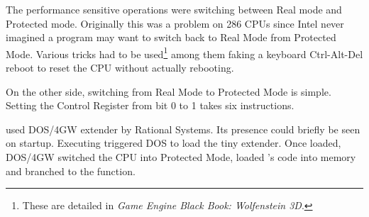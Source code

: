 The performance sensitive operations were switching between Real mode and Protected mode. Originally this was a problem on 286 CPUs since Intel never imagined a program may want to switch back to Real Mode from Protected Mode. Various tricks had to be used\footnote{These are detailed in \textit{Game Engine Black Book: Wolfenstein 3D}.} among them faking a keyboard Ctrl-Alt-Del reboot to reset the CPU without actually rebooting.\\
\par
On the other side, switching from Real Mode to Protected Mode is simple. Setting the Control Register from bit 0 to 1 takes six instructions.\\
\par
{}
\par

\doom{} used DOS/4GW extender by Rational Systems. Its presence could briefly be seen on startup. Executing  triggered DOS to load the tiny extender. Once loaded, DOS/4GW switched the CPU into Protected Mode, loaded \doom's code into memory and branched to the  function.\\
\par
{}





